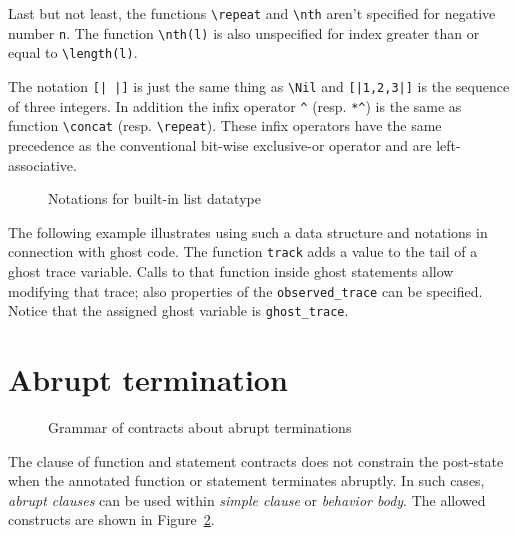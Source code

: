 Last but not least, the functions \lstinline|\repeat| and \lstinline|\nth|
aren't specified for negative number \lstinline|n|.
The function \lstinline|\nth(l)| is also unspecified for index greater than or
equal to \lstinline|\length(l)|.

The notation \lstinline![| |]! is just the same thing as \lstinline|\Nil| and
\lstinline![|1,2,3|]! is the sequence of three integers.
In addition the infix operator \lstinline|^| (resp. \lstinline|*^|)
is the same as function \lstinline|\concat| (resp. \lstinline|\repeat|).
These infix operators have the same precedence as the conventional bit-wise exclusive-or operator
and are left-associative.

\begin{figure}[htp]
  \begin{cadre}
      
    \end{cadre}
  \caption{Notations for built-in list datatype}
\label{fig:gram:list}
\end{figure}

\begin{example}
  The following example illustrates using such a data structure and
  notations in connection with ghost code.
  The function \lstinline|track| adds a value to the tail of a ghost trace variable.
  Calls to that function inside ghost statements allow modifying that trace;
  also properties of the \lstinline|observed_trace| can be specified.
  Notice that the assigned ghost variable is \lstinline|ghost_trace|.
\end{example}


\section{Abrupt termination}
\label{sec:abrupt-clause}

\begin{figure}[htp]
  \begin{cadre}
     
    \end{cadre}
    \caption{Grammar of contracts about abrupt terminations}
  \label{fig:gram:abrupt-clauses}
\end{figure}

The \ensures{} clause of function and statement contracts
does not constrain the post-state when the annotated function or
statement terminates abruptly. In such cases,
\textsl{abrupt clauses} can be used within \textsl{simple clause} or
\textsl{behavior body}. The allowed constructs are shown in
Figure~\ref{fig:gram:abrupt-clauses}.

